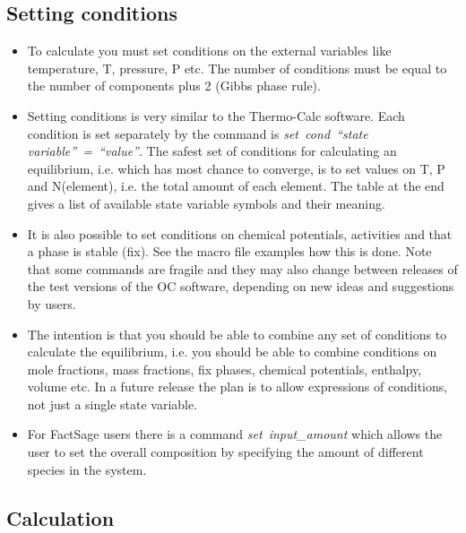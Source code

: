 \documentclass[12pt]{article}
\begin{document}
\subsection{Setting conditions}

\begin{itemize}
\item To calculate you must set conditions on the external variables
  like temperature, T, pressure, P etc.  The number of conditions must
  be equal to the number of components plus 2 (Gibbs phase rule).

\item Setting conditions is very similar to the Thermo-Calc software.
  Each condition is set separately by the command is {\em
    set~cond~``state variable''~=~``value''}.  The safest set of
  conditions for calculating an equilibrium, i.e. which has most
  chance to converge, is to set values on T, P and N(element),
  i.e. the total amount of each element.  The table at the end gives a
  list of available state variable symbols and their meaning.

\item It is also possible to set conditions on chemical potentials,
  activities and that a phase is stable (fix).  See the macro file
  examples how this is done.  Note that some commands are fragile and
  they may also change between releases of the test versions of the OC
  software, depending on new ideas and suggestions by users.

\item The intention is that you should be able to combine any set of
  conditions to calculate the equilibrium, i.e. you should be able to
  combine conditions on mole fractions, mass fractions, fix phases,
  chemical potentials, enthalpy, volume etc.  In a future release the
  plan is to allow expressions of conditions, not just a single state
  variable.

\item For FactSage users there is a command {\em set~input\_amount}
  which allows the user to set the overall composition by specifying
  the amount of different species in the system.

\end{itemize}

\subsection{Calculation}
\end{document}
